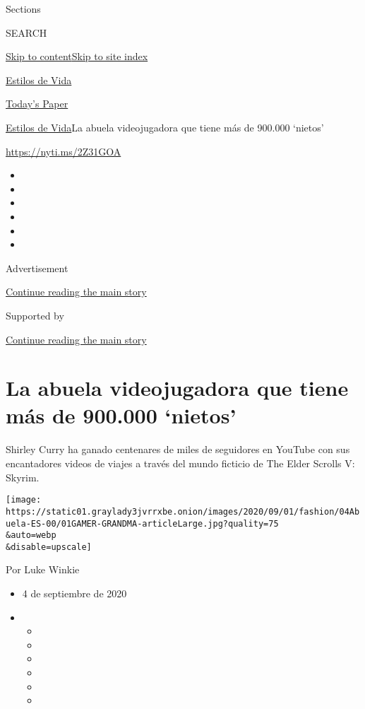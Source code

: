 Sections

SEARCH

\protect\hyperlink{site-content}{Skip to
content}\protect\hyperlink{site-index}{Skip to site index}

\href{https://www.nytimes3xbfgragh.onion/es/section/estilos-de-vida}{Estilos
de Vida}

\href{https://myaccount.nytimes3xbfgragh.onion/auth/login?response_type=cookie\&client_id=vi}{}

\href{https://www.nytimes3xbfgragh.onion/section/todayspaper}{Today's
Paper}

\href{/es/section/estilos-de-vida}{Estilos de Vida}\textbar{}La abuela
videojugadora que tiene más de 900.000 `nietos'

\url{https://nyti.ms/2Z31GOA}

\begin{itemize}
\item
\item
\item
\item
\item
\item
\end{itemize}

Advertisement

\protect\hyperlink{after-top}{Continue reading the main story}

Supported by

\protect\hyperlink{after-sponsor}{Continue reading the main story}

\hypertarget{la-abuela-videojugadora-que-tiene-muxe1s-de-900000-nietos}{%
\section{La abuela videojugadora que tiene más de 900.000
`nietos'}\label{la-abuela-videojugadora-que-tiene-muxe1s-de-900000-nietos}}

Shirley Curry ha ganado centenares de miles de seguidores en YouTube con
sus encantadores videos de viajes a través del mundo ficticio de The
Elder Scrolls V: Skyrim.

\texttt{[image: https://static01.graylady3jvrrxbe.onion/images/2020/09/01/fashion/04Abuela-ES-00/01GAMER-GRANDMA-articleLarge.jpg?quality=75\\\&auto=webp\\\&disable=upscale]}

Por Luke Winkie

\begin{itemize}
\item
  4 de septiembre de 2020
\item
  \begin{itemize}
  \item
  \item
  \item
  \item
  \item
  \item
  \end{itemize}
\end{itemize}

